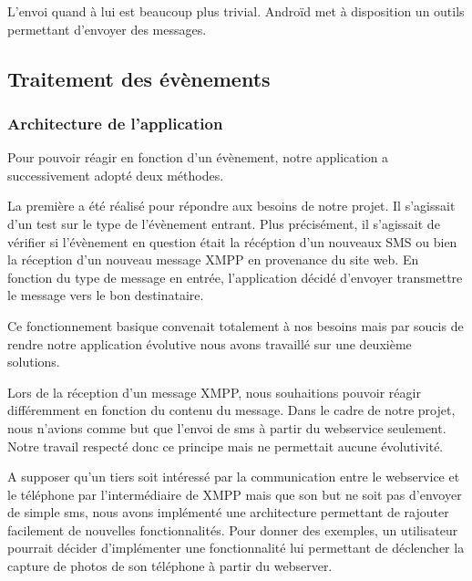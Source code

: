 L'envoi quand à lui est beaucoup plus trivial. Androïd met à disposition un outils permettant d'envoyer
des messages.
\\



\subsection{Traitement des évènements}

\subsubsection{Architecture de l'application}

Pour pouvoir réagir en fonction d'un évènement, notre application a successivement adopté deux méthodes.

La première a été réalisé pour répondre aux besoins de notre projet. Il s'agissait d'un test sur le 
type de l'évènement entrant. Plus précisément, il s'agissait de vérifier si l'évènement en question 
était la récéption d'un nouveaux SMS ou bien la réception d'un nouveau message XMPP en provenance du 
site web. En fonction du type de message en entrée, l'application décidé d'envoyer transmettre le message
vers le bon destinataire. 

Ce fonctionnement basique convenait totalement à nos besoins mais par soucis de rendre notre application
évolutive nous avons travaillé sur une deuxième solutions.

Lors de la réception d'un message XMPP, nous souhaitions pouvoir réagir différemment en fonction du contenu
du message. Dans le cadre de notre projet, nous n'avions comme but que l'envoi de sms à partir du webservice
seulement. Notre travail respecté donc ce principe mais ne permettait aucune évolutivité.

A supposer qu'un tiers soit intéressé par la communication entre le webservice et le téléphone par 
l'intermédiaire de XMPP mais que son but ne soit pas d'envoyer de simple sms, nous avons implémenté une
architecture permettant de rajouter facilement de nouvelles fonctionnalités. Pour donner des exemples, 
un utilisateur pourrait décider d'implémenter une fonctionnalité lui permettant de déclencher la capture
de photos de son téléphone à partir du webserver.

